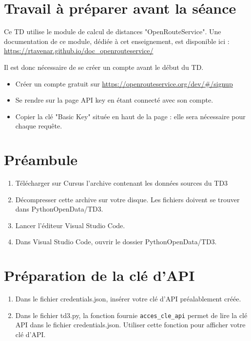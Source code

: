 \documentclass[11pt,a4paper]{article}
\begin{document}
\section*{Travail à préparer avant la séance}

Ce TD utilise le module de calcul de distances "OpenRouteService". Une documentation de ce module, dédiée à cet enseignement, est disponible ici : 
\url{https://rtavenar.github.io/doc_openrouteservice/}

Il est donc nécessaire de se créer un compte avant le début du TD.

\begin{itemize}
    \item Créer un compte gratuit sur \url{https://openrouteservice.org/dev/#/signup}
    \item Se rendre sur la page API key en étant connecté avec son compte.
    \item Copier la clé "Basic Key" située en haut de la page : elle sera nécessaire pour chaque requête.
\end{itemize}

\section*{Préambule}
\begin{enumerate}
    \item Télécharger sur Cursus l'archive contenant les données sources du TD3
    \item Décompresser cette archive sur votre disque. 
    Les fichiers doivent se trouver dans PythonOpenData/TD3.
    \item Lancer l'éditeur Visual Studio Code.
    \item Dans Visual Studio Code, ouvrir le dossier PythonOpenData/TD3. 
\end{enumerate}


\section{Préparation de la clé d'API}
\begin{enumerate}
    \item Dans le fichier credentials.json, insérer votre clé d'API préalablement créée.
    \item Dans le fichier td3.py, la fonction fournie \verb+acces_cle_api+ permet de lire la clé API dans le fichier credentials.json. 
    Utiliser cette fonction pour afficher votre clé d'API.
\end{enumerate}
        
\end{document}
